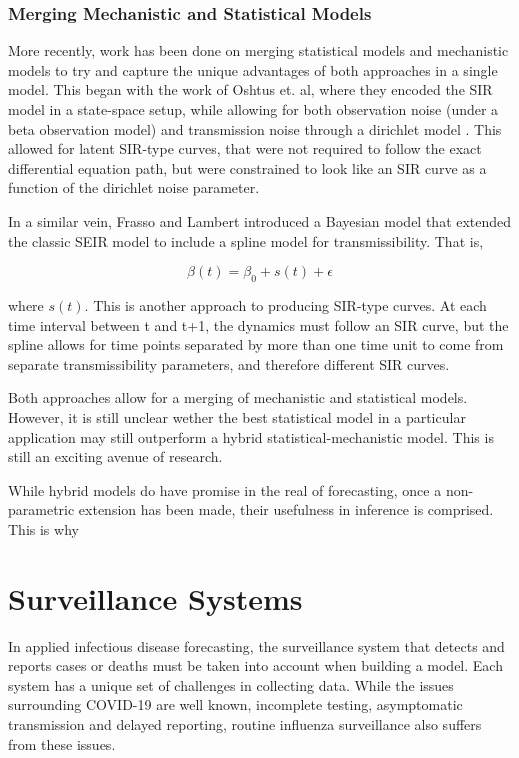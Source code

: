\documentclass{umassthesis}          %
\begin{document}
\subsubsection{Merging Mechanistic and Statistical Models}

More recently, work has been done on merging statistical models and mechanistic models to try and capture the unique advantages of both approaches in a single model. This began with the work of Oshtus et. al, where they encoded the SIR model in a state-space setup, while allowing for both observation noise (under a beta observation model) and transmission noise through a dirichlet model \cite{osthus2017forecasting}. This allowed for latent SIR-type curves, that were not required to follow the exact differential equation path, but were constrained to look like an SIR curve as a function of the dirichlet noise parameter. 

In a similar vein, Frasso and Lambert introduced a Bayesian model that extended the classic SEIR model to include a spline model for transmissibility. That is, 

\begin{equation}
\beta(t) = \beta_0 + s(t) + \epsilon
\end{equation}

where $s(t)$. This is another approach to producing SIR-type curves. At each time interval between t and t+1, the dynamics must follow an SIR curve, but the spline allows for time points separated by more than one time unit to come from separate transmissibility parameters, and therefore different SIR curves. 

Both approaches allow for a merging of mechanistic and statistical models. However, it is still unclear wether the best statistical model in a particular application may still outperform a hybrid statistical-mechanistic model. This is still an exciting avenue of research.

While hybrid models do have promise in the real of forecasting, once a non-parametric extension has been made, their usefulness in inference is comprised. This is why 

\section{Surveillance Systems}

In applied infectious disease forecasting, the surveillance system that detects and reports cases or deaths must be taken into account when building a model. Each system has a unique set of challenges in collecting data. While the issues surrounding COVID-19 are well known, incomplete testing, asymptomatic transmission and delayed reporting, routine influenza surveillance also suffers from these issues. 
\end{document}
